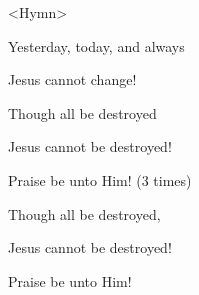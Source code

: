 \setcounter{footnote}{0}

<Hymn>

Yesterday, today, and always

Jesus cannot change!

Though all be destroyed

Jesus cannot be destroyed!

Praise be unto Him! (3 times)

Though all be destroyed,

Jesus cannot be destroyed!

Praise be unto Him!


